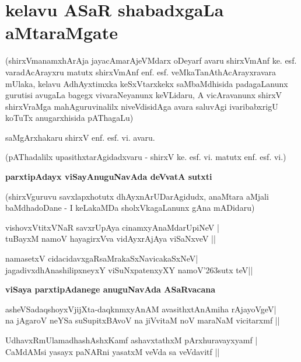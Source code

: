 {\chapter{kelavu ASaR shabadxgaLa aMtaraMgate}}

\noindent
(shirxVmanamxhArAja jayacAmarAjeVMdarx oDeyarf avaru shirxVmAnf ke. esf. varadAcArayxru matutx shirxVmAnf enf. esf. veMkaTanAthAcArayxravara mUlaka, kelavu AdhAyxtimxka keSxVtarxkekx saMbaMdhisida pada\-gaLanunx gurutisi avugaLa bagegx vivaraNeyanunx keVLidaru, A vicAravanunx shirxV shirxVraMga mahAguruvinalilx niveVdisidAga avara saluvAgi ivaribabxrigU koTuTx anugarxhisida pAThagaLu)

\medskip

\hfill{saMgArxhakaru shirxV enf. esf. vi. avaru.}

\medskip
\noindent
\centerline{(pAThadalilx upasithxtarAgidadxvaru - shirxV ke. esf. vi. matutx enf. esf. vi.)}

\bigskip
\noindent
{\large\bf parxtipAdayx viSayAnuguNavAda deVvatA sutxti}\label{page128}
\medskip

\noindent
(shirxVguruvu savxlapxhotutx dhAyxnArUDarAgidudx, anaMtara aMjali baMdhadoDane - I keLakaMDa sholxVka\-gaLanunx gAna mADidaru)


\begin{shloka}
vishovxVtitxVNaR savxrUpAya cinamxyAnaMdarUpiNeV |\\\label{128}
tuBayxM namoV hayagirxVva vidAyxrAjAya viSaNxveV ||
\end{shloka}
\begin{shloka}
namasetxV cidacidavxgaRsaMrakaSxNavicakaSxNeV|\\\label{128}
jagadivxdhAnashilipxneyxY viSuNxpatenxyXY namoV\char'263sutx teV||
\end{shloka}


\newpage

\bigskip
\noindent
{\large\bf viSaya parxtipAdanege anuguNavAda ASaRvacana}

\begin{shloka}
asheVSadaqshoyxVjijXta-daqknmxyAnAM avasithxtAnAmiha rAjayoVgeV|\\\label{128}
na jAgaroV neYSa suSupitxBAvoV na jiVvitaM noV maraNaM vicitarxmf ||
\end{shloka}
\begin{shloka}
UdhavxRmUlamadhashAshxKamf ashavxtathxM pArxhuravayxyamf |\\\label{128}
CaMdAMsi yasayx paNARni yasatxM veVda sa veVdavitf ||
\end{shloka}

